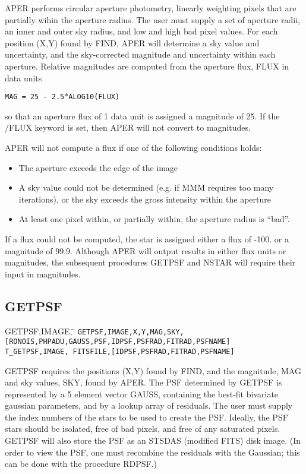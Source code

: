 APER performs circular aperture photometry, linearly weighting pixels
that are partially wihin the aperture radius.
The user must supply a set of aperture radii, an inner and
outer sky radius, and low and high bad pixel values.   
For each position (X,Y) found by FIND, APER will determine a sky value
and uncertainty, and the sky-corrected magnitude and uncertainty 
within each aperture.   Relative magnitudes are computed from the aperture flux,
FLUX in data units 
\begin{center}
{\tt MAG = 25 - 2.5$\ast$ALOG10(FLUX)} 
\end{center}
so that an aperture flux of 1 data unit is assigned a magnitude of 25.
If the /FLUX keyword is set, then APER will not convert to magnitudes.

APER will not compute a flux if one of the 
following conditions holds:
\begin{itemize}
\item The aperture exceeds the edge of the image
\item A sky value could not be determined (e.g. if MMM requires too many
      iterations), or the sky exceeds the gross intensity within the 
      aperture
\item At least one pixel within, or partially within, the aperture radius
      is ``bad''.                              
\end{itemize}

If a flux could not be computed, the star is assigned either a flux
of -100. or a magnitude of 99.9.
Although APER will output results in either flux units or magnitudes,
the subsequent procedures GETPSF and NSTAR will require their input in
magnitudes.
\subsection{GETPSF}                         
\begin{tabbing}
GETPSF,IMAGE, \=   \kill
{\tt GETPSF,IMAGE,X,Y,MAG,SKY,} \\
\>  {\tt  [RONOIS,PHPADU,GAUSS,PSF,IDPSF,PSFRAD,FITRAD,PSFNAME]} \\
{\tt T\_GETPSF,IMAGE, FITSFILE,[IDPSF,PSFRAD,FITRAD,PSFNAME]} \\
\end{tabbing}
                                                      
GETPSF requires the positions (X,Y) found by FIND, and the magnitude,
MAG and sky values, SKY, found by APER.  The PSF determined by GETPSF
is represented by a 5 element vector GAUSS, containing the best-fit
bivariate gaussian parameters, and by a lookup array of residuals.
The user must supply the index numbers of the stars to be used to create
the PSF.   Ideally, the PSF stars should be isolated, free of bad pixels, 
and free of any saturated pixels.
GETPSF will also store the PSF as an STSDAS (modified FITS) disk image.
(In order to view the PSF, one must recombine the residuals with the Gaussian;
this can be done with the procedure RDPSF.)

